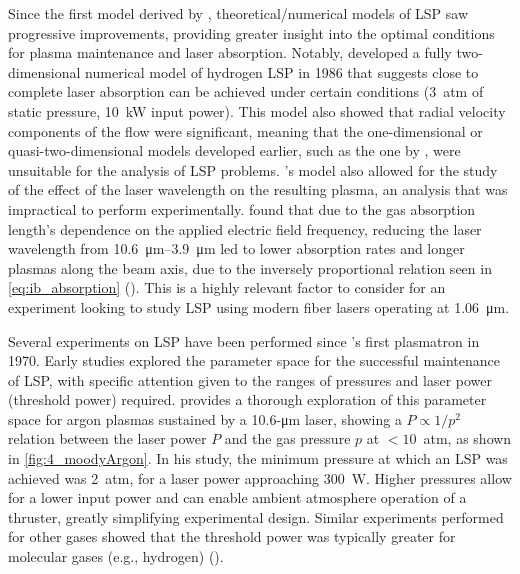         Since the first model derived by \citeauthor{raizerSubsonicPropagationLight1970}, theoretical/numerical models of LSP saw progressive improvements, providing greater insight into the optimal conditions for plasma maintenance and laser absorption. Notably, \textcite{jengNumericalStudyLasersustained1986} developed a fully two-dimensional numerical model of hydrogen LSP in 1986 that suggests close to complete laser absorption can be achieved under certain conditions (3~atm of static pressure, 10~kW input power). This model also showed that radial velocity components of the flow were significant, meaning that the one-dimensional or quasi-two-dimensional models developed earlier, such as the one by \textcite{battehTwoDimensionalGeneralization1974}, were unsuitable for the analysis of LSP problems. \citeauthor{jengNumericalStudyLasersustained1986}'s model also allowed for the study of the effect of the laser wavelength on the resulting plasma, an analysis that was impractical to perform experimentally. \citeauthor{jengNumericalStudyLasersustained1986} found that due to the gas absorption length's dependence on the applied electric field frequency, reducing the laser wavelength from \qtyrange{10.6}{3.9}{\um} led to lower absorption rates and longer plasmas along the beam axis, due to the inversely proportional relation seen in \autoref{eq:ib_absorption} (\textcite{keeferLaserSustainedPlasmas1989}). This is a highly relevant factor to consider for an experiment looking to study LSP using modern fiber lasers operating at \qty{1.06}{\um}.

        Several experiments on LSP have been performed since \citeauthor{generalovContinuousOpticalDischarge1970}'s first plasmatron in 1970. Early studies explored the parameter space for the successful maintenance of LSP, with specific attention given to the ranges of pressures and laser power (threshold power) required. \textcite{moodyMaintenanceGasBreakdown1975} provides a thorough exploration of this parameter space for argon plasmas sustained by a 10.6-\unit{\um} laser, showing a $P \propto 1/p^2$ relation between the laser power $P$ and the gas pressure $p$ at $<10$~atm, as shown in \autoref{fig:4_moodyArgon}. In his study, the minimum pressure at which an LSP was achieved was 2~atm, for a laser power approaching 300~W. Higher pressures allow for a lower input power and can enable ambient atmosphere operation of a thruster, greatly simplifying experimental design. Similar experiments performed for other gases showed that the threshold power was typically greater for molecular gases (e.g.,  hydrogen) (\textcite{keeferLaserSustainedPlasmas1989}).

